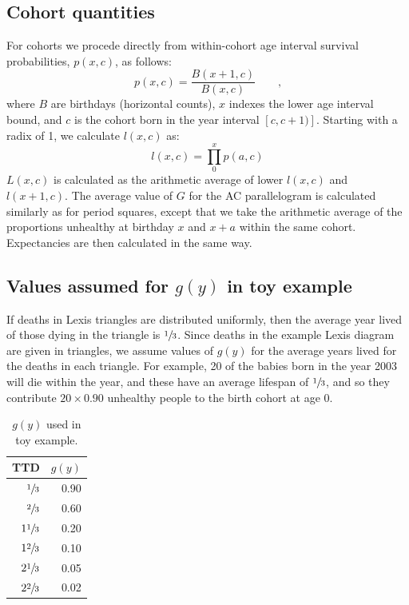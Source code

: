 \documentclass[11pt,oneside,a4paper]{article} %
\newcommand{\tc}{\quad\quad\text{,}}
\begin{document}
\subsection{Cohort quantities}
For cohorts we procede directly from within-cohort age interval survival
probabilities, $p(x,c)$, as follows:
\begin{equation}
p(x,c) = \frac{B(x+1,c)}{B(x,c)} \tc
\end{equation}
where $B$ are birthdays (horizontal counts), $x$ indexes the lower age interval
bound, and $c$ is the cohort born in the year interval $[c,c+1)]$. Starting with
a radix of 1, we calculate $l(x,c)$ as:
\begin{equation}
l(x,c) = \prod_0^x p(a,c)
\end{equation}
$L(x,c)$ is calculated as the arithmetic average of lower $l(x,c)$ and
$l(x+1,c)$. The average value of $G$ for the AC parallelogram is calculated
similarly as for period squares, except that we take the arithmetic average of
the proportions unhealthy at birthday $x$ and $x+a$ within the same cohort.
Expectancies are then calculated in the same way.

\subsection{Values assumed for $g(y)$ in toy example}
If deaths in Lexis triangles are distributed uniformly, then the average year
lived of those dying in the triangle is $\sfrac{1}{3}$. Since deaths in the
example Lexis diagram are given in triangles, we assume values of $g(y)$ for the
average years lived for the deaths in each triangle. For example, 20 of the
babies born in the year 2003 will die within the year, and these have an average
lifespan of $\sfrac{1}{3}$, and so they contribute $20\times0.90$ unhealthy
people to the birth cohort at age 0. 

 \begin{table}[ht]
\centering
\begin{tabular}{rr}
\hline
TTD & $g(y)$ \\
\hline
$\sfrac{1}{3}$ & 0.90 \\
$\sfrac{2}{3}$ & 0.60 \\
$1\sfrac{1}{3}$ & 0.20 \\
$1\sfrac{2}{3}$ & 0.10 \\
$2\sfrac{1}{3}$ & 0.05 \\
$2\sfrac{2}{3}$ & 0.02 \\
\hline
\end{tabular}
\caption{$g(y)$ used in toy example.}
\label{tab:gy}
\end{table}
\end{document}
